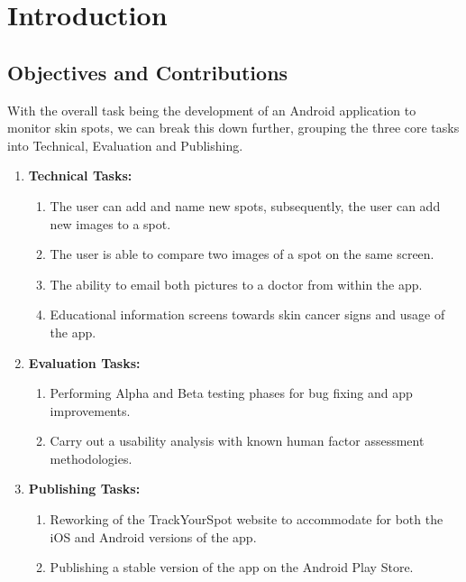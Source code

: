 \chapter{Introduction}

\section{Objectives and Contributions}
With the overall task being the development of an Android application to monitor skin spots, we can break this down further, grouping the three core tasks into Technical, Evaluation and Publishing.
\begin{enumerate}
    \item \textbf{Technical Tasks:}
    \begin{enumerate}
        \item The user can add and name new spots, subsequently, the user can add new images to a spot.
        \item The user is able to compare two images of a spot on the same screen.
        \item The ability to email both pictures to a doctor from within the app.
        \item Educational information screens towards skin cancer signs and usage of the app.
    \end{enumerate}
    \item \textbf{Evaluation Tasks:}
    \begin{enumerate}
        \item Performing Alpha and Beta testing phases for bug fixing and app improvements.
        \item Carry out a usability analysis with known human factor assessment methodologies.
    \end{enumerate}
    \item \textbf{Publishing Tasks:}
    \begin{enumerate}
        \item Reworking of the TrackYourSpot website to accommodate for both the iOS and Android versions of the app.
        \item Publishing a stable version of the app on the Android Play Store.
    \end{enumerate}
\end{enumerate}


